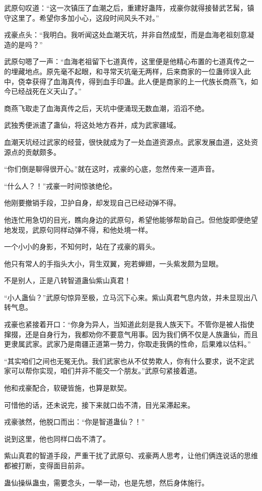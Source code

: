 \begin{this_body}
武原句叹道：“这一次镇压了血潮之后，重建好蛊阵，戎豪你就得接替武艺髯，镇守这里了。希望你多加小心，这段时间风头不对。”

戎豪点头：“我明白。我听闻这处血潮天坑，并非自然成型，而是血海老祖刻意凝造的是吗？”

武原句嗯了一声：“血海老祖留下七道真传，这里便是他精心布置的七道真传之一的埋藏地点。原先毫不起眼，和寻常天坑毫无两样，后来商家的一位蛊师误入此中，侥幸获得了血海真传，得到血手印蛊。此人便是商家的上一代族长商燕飞，如今已经战死在义天山了。”

商燕飞取走了血海真传之后，天坑中便涌现无数血潮，滔滔不绝。

武独秀便派遣了蛊仙，将这处地方吞并，成为武家疆域。

血潮天坑经过武家的经营，很快就成为了一处血道资源点。武家发展血道，这处资源点的贡献颇多。

“你们倒是聊得很开心。”就在这时，戎豪的心底，忽然传来一道声音。

“什么人？！”戎豪一时间惊骇绝伦。

他刚要撤销手段，卫护自身，却发现自己已经动弹不得。

他连忙用急切的目光，瞧向身边的武原句，希望他能够帮助自己。但他旋即便绝望地发现，武原句同样动弹不得，和他处境一样。

一个小小的身影，不知何时，站在了戎豪的肩头。

他只有常人的手指头大小，背生双翼，宛若蝉翅，一头紫发颇为显眼。

不是别人，正是八转智道蛊仙紫山真君！

“小人蛊仙？”武原句惊异至极，立马沉下心来。紫山真君气息内敛，并未显现出八转气息。

戎豪也紧接着开口：“你身为异人，当知道此刻是我人族天下。不管你是被人指使撺掇，还是自身行为，我都劝你不要意气用事。因为我们俩不仅是人族蛊仙，而且更隶属武家。武家乃是南疆正道第一势力，你取走我俩的性命，后果难以估料。”

“其实咱们之间也无冤无仇。我们武家也从不仗势欺人，你有什么要求，说不定武家可以帮你实现，咱们并非不能交一个朋友。”武原句紧接着道。

他和戎豪配合，软硬皆施，也算是默契。

可惜他的话，还未说完，接下来就口齿不清，目光呆滞起来。

戎豪骇然，他脱口而出：“你是智道蛊仙？！”

说到这里，他也同样口齿不清了。

紫山真君的智道手段，严重干扰了武原句、戎豪两人思考，让他们俩连说话的思维都被打断，变得面目前非。

蛊仙操纵蛊虫，需要念头，一举一动，也是先想，然后身体施行。


\end{this_body}
